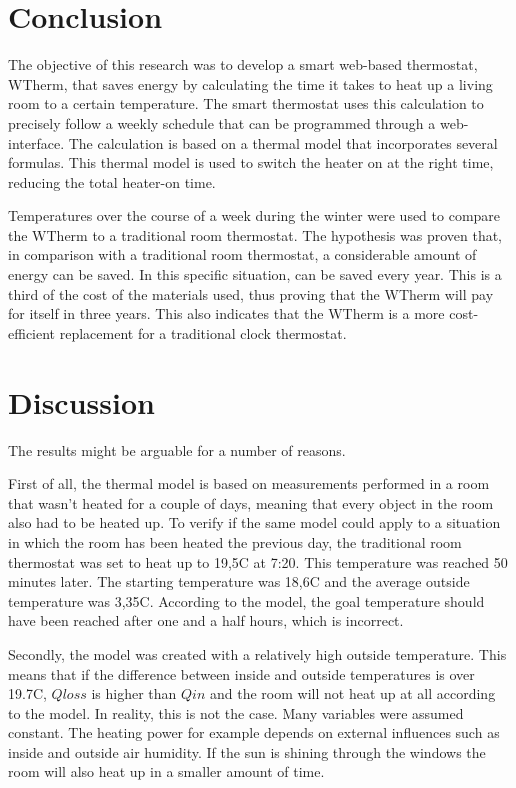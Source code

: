 \documentclass[12pt,a4paper,final]{report}
\begin{document}
\part{Conclusion}
The objective of this research was to develop a smart web-based thermostat, WTherm, that saves energy by calculating the time it takes to heat up a living room to a certain temperature. The smart thermostat uses this calculation to precisely follow a weekly schedule that can be programmed through a web-interface. The calculation is based on a thermal model that incorporates several formulas. This thermal model is used to switch the heater on at the right time, reducing the total heater-on time.

Temperatures over the course of a week during the winter were used to compare the WTherm to a traditional room thermostat. The hypothesis was proven that, in comparison with a traditional room thermostat, a considerable amount of energy can be saved. In this specific situation,  can be saved every year. This is a third of the cost of the materials used, thus proving that the WTherm will pay for itself in three years. This also indicates that the WTherm is a more cost-efficient replacement for a traditional clock thermostat.

\part{Discussion}
The results might be arguable for a number of reasons.

First of all, the thermal model is based on measurements performed in a room that wasn't heated for a couple of days, meaning that every object in the room also had to be heated up. To verify if the same model could apply to a situation in which the room has been heated the previous day, the traditional room thermostat was set to heat up to 19,5\degree{}C at 7:20. This temperature was reached 50 minutes later. The starting temperature was 18,6\degree{}C and the average outside temperature was 3,35\degree{}C. According to the model, the goal temperature should have been reached after one and a half hours, which is incorrect.

Secondly, the model was created with a relatively high outside temperature. This means that if the difference between inside and outside temperatures is over 19.7\degree{}C, $Qloss$ is higher than $Qin$ and the room will not heat up at all according to the model. In reality, this is not the case. Many variables were assumed constant. The heating power for example depends on external influences such as inside and outside air humidity. If the sun is shining through the windows the room will also heat up in a smaller amount of time.
\end{document}
